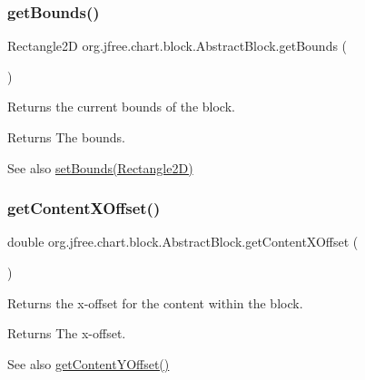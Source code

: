 \subsubsection{\texorpdfstring{get\+Bounds()}{getBounds()}}
{\footnotesize\ttfamily Rectangle2D org.\+jfree.\+chart.\+block.\+Abstract\+Block.\+get\+Bounds (\begin{DoxyParamCaption}{ }\end{DoxyParamCaption})}

Returns the current bounds of the block.

\begin{DoxyReturn}{Returns}
The bounds.
\end{DoxyReturn}
\begin{DoxySeeAlso}{See also}
\mbox{\hyperlink{classorg_1_1jfree_1_1chart_1_1block_1_1_abstract_block_a3e37dd75e1c2b3a7ae7111782e2610f5}{set\+Bounds(\+Rectangle2\+D)}} 
\end{DoxySeeAlso}
\mbox{\label{classorg_1_1jfree_1_1chart_1_1block_1_1_abstract_block_a7ef10497b6cb5b58586f0420732c10ec}} 
\subsubsection{\texorpdfstring{get\+Content\+X\+Offset()}{getContentXOffset()}}
{\footnotesize\ttfamily double org.\+jfree.\+chart.\+block.\+Abstract\+Block.\+get\+Content\+X\+Offset (\begin{DoxyParamCaption}{ }\end{DoxyParamCaption})}

Returns the x-\/offset for the content within the block.

\begin{DoxyReturn}{Returns}
The x-\/offset.
\end{DoxyReturn}
\begin{DoxySeeAlso}{See also}
\mbox{\hyperlink{classorg_1_1jfree_1_1chart_1_1block_1_1_abstract_block_afa40c60e4938dd89537383b31894234f}{get\+Content\+Y\+Offset()}} 
\end{DoxySeeAlso}
\mbox{\label{classorg_1_1jfree_1_1chart_1_1block_1_1_abstract_block_afa40c60e4938dd89537383b31894234f}} 

